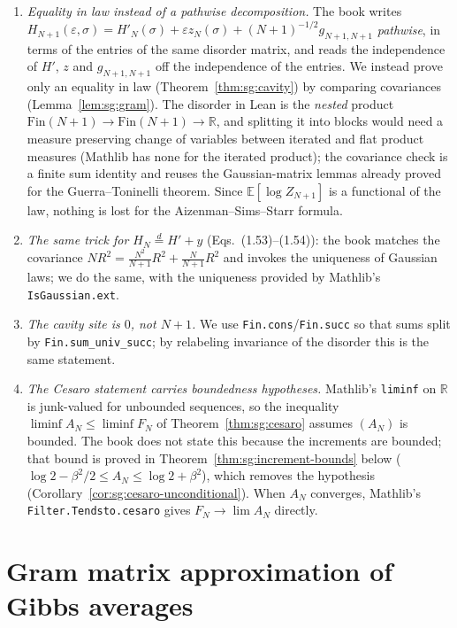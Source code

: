 \begin{remark}\label{rem:sg:ass-deviation}
\begin{enumerate}
\item \emph{Equality in law instead of a pathwise decomposition.} The book writes $H_{N+1}(\varepsilon,\sigma)=H'_N(\sigma)+\varepsilon z_N(\sigma)+(N+1)^{-1/2}g_{N+1,N+1}$
\emph{pathwise}, in terms of the entries of the same disorder matrix, and reads the independence of $H'$, $z$ and $g_{N+1,N+1}$ off the independence of
the entries. We instead prove only an equality in law (Theorem~\ref{thm:sg:cavity}) by comparing covariances (Lemma~\ref{lem:sg:gram}). The disorder in
Lean is the \emph{nested} product $\mathrm{Fin}(N+1)\to\mathrm{Fin}(N+1)\to\mathbb R$, and splitting it into blocks would need a measure preserving
change of variables between iterated and flat product measures (Mathlib has none for the iterated product); the covariance check is a finite sum identity
and reuses the Gaussian-matrix lemmas already proved for the Guerra--Toninelli theorem. Since $\mathbb E[\log Z_{N+1}]$ is a functional of the law, nothing is
lost for the Aizenman--Sims--Starr formula.
\item \emph{The same trick for $H_N\overset d=H'+y$} (Eqs.~(1.53)--(1.54)): the book matches the covariance $N R^2=\frac{N^2}{N+1}R^2+\frac N{N+1}R^2$ and
invokes the uniqueness of Gaussian laws; we do the same, with the uniqueness provided by Mathlib's \texttt{IsGaussian.ext}.
\item \emph{The cavity site is $0$, not $N+1$.} We use \texttt{Fin.cons}/\texttt{Fin.succ} so that sums split by \texttt{Fin.sum\_univ\_succ}; by relabeling
invariance of the disorder this is the same statement.
\item \emph{The Cesaro statement carries boundedness hypotheses.} Mathlib's \texttt{liminf} on $\mathbb R$ is junk-valued for unbounded sequences, so the
inequality $\liminf A_N\le\liminf F_N$ of Theorem~\ref{thm:sg:cesaro} assumes $(A_N)$ is bounded. The book does not state this because the increments are bounded;
that bound is proved in Theorem~\ref{thm:sg:increment-bounds} below ($\log2-\beta^2/2\le A_N\le\log2+\beta^2$), which removes the hypothesis
(Corollary~\ref{cor:sg:cesaro-unconditional}). When $A_N$ converges, Mathlib's \texttt{Filter.Tendsto.cesaro} gives $F_N\to\lim A_N$ directly.
\end{enumerate}
\end{remark}

\section{Gram matrix approximation of Gibbs averages}\label{sec:sg:gram-approx}

